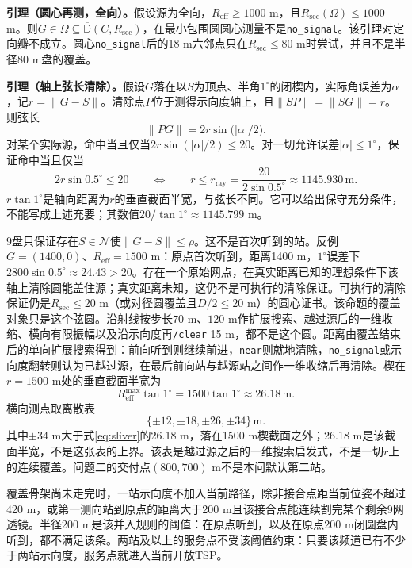 \documentclass{cumcmthesis}
\begin{document}
\textbf{引理（圆心再测，全向）。}假设源为全向，$R_{\mathrm{eff}}\ge 1000$ m，且$R_{\mathrm{sec}}(\Omega)\le 1000$ m。则$G\in\Omega\subseteq\overline{\mathbb{D}}(C,R_{\mathrm{sec}})$，在最小包围圆圆心测量不是\texttt{no\_signal}。该引理对定向瓣不成立。圆心\texttt{no\_signal}后的18 m六邻点只在$R_{\mathrm{sec}}\le 80$ m时尝试，并且不是半径80 m盘的覆盖。

\textbf{引理（轴上弦长清除）。}假设$G$落在以$S$为顶点、半角$1^\circ$的闭楔内，实际角误差为$\alpha$，记$r=\|G-S\|$。清除点$P$位于测得示向度轴上，且$\|SP\|=\|SG\|=r$。则弦长
\begin{equation}
\|PG\|=2r\sin\bigl(|\alpha|/2\bigr).
\label{eq:chord}
\end{equation}
对某个实际源，命中当且仅当$2r\sin(|\alpha|/2)\le 20$。对一切允许误差$|\alpha|\le 1^\circ$，保证命中当且仅当
\begin{equation}
2r\sin 0.5^\circ\le 20\qquad\Leftrightarrow\qquad r\le r_{\mathrm{ray}}=\frac{20}{2\sin 0.5^\circ}\approx 1145.930\,\mathrm{m}.
\label{eq:rray}
\end{equation}
$r\tan 1^\circ$是轴向距离为$r$的垂直截面半宽，与弦长不同。它可以给出保守充分条件，不能写成上述充要；其数值$20/\tan 1^\circ\approx 1145.799$ m。

9盘只保证存在$S\in\mathcal{N}$使$\|G-S\|\le\rho$。这不是首次听到的站。反例$G=(1400,0)$、$R_{\mathrm{eff}}=1500$ m：原点首次听到，距离1400 m，$1^\circ$误差下$2800\sin 0.5^\circ\approx 24.43>20$。存在一个原始网点，在真实距离已知的理想条件下该轴上清除圆能盖住源；真实距离未知，这仍不是可执行的清除保证。可执行的清除保证仍是$R_{\mathrm{sec}}\le 20$ m（或对径圆覆盖且$D/2\le 20$ m）的圆心证书。该命题的覆盖对象只是这个弦圆。沿射线按步长$70$ m、$120$ m作扩展搜索、越过源后的一维收缩、横向有限振幅以及沿示向度再\texttt{/clear} 15 m，都不是这个圆。距离由覆盖结束后的单向扩展搜索得到：前向听到则继续前进，\texttt{near}则就地清除，\texttt{no\_signal}或示向度翻转则认为已越过源，在最后前向站与越源站之间作一维收缩后再清除。楔在$r=1500$ m处的垂直截面半宽为
\begin{equation}
R_{\mathrm{eff}}^{\max}\tan 1^\circ=1500\tan 1^\circ\approx 26.18\,\mathrm{m}.
\label{eq:sliver}
\end{equation}
横向测点取离散表
\[
\{\pm 12,\pm 18,\pm 26,\pm 34\}\,\mathrm{m}.
\]
其中$\pm 34$ m大于式\eqref{eq:sliver}的26.18 m，落在1500 m楔截面之外；26.18 m是该截面半宽，不是这张表的上界。该表是越过源之后的一维搜索启发式，不是一切$r$上的连续覆盖。问题二的交付点$(800,700)$ m不是本问默认第二站。

覆盖骨架尚未走完时，一站示向度不加入当前路径，除非接合点距当前位姿不超过420 m，或第一测向站到原点的距离大于200 m且该接合点能连续割完某个剩余9网透镜。半径200 m是该并入规则的阈值：在原点听到，以及在原点200 m闭圆盘内听到，都不满足该条。两站及以上的服务点不受该阈值约束：只要该频道已有不少于两站示向度，服务点就进入当前开放TSP。
\end{document}
